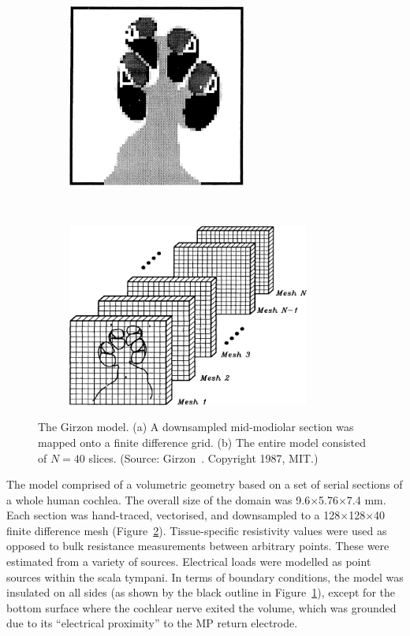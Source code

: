 \begin{figure}
	\centering
    \begin{subfigure}[t]{0.4\textwidth}
        \centering
        \includegraphics[height=6cm]{Background/girzon_section}
        \caption{ }
        \label{fig:girzon_section}
    \end{subfigure}
    ~~~~
    \begin{subfigure}[t]{0.52\textwidth}
        \centering
        \includegraphics[height=6cm]{Background/girzon_slices}
        \caption{ }
        \label{fig:girzon_slices}
    \end{subfigure}
    \caption[The Girzon model]{The Girzon model. (a) A downsampled mid-modiolar
	section was mapped onto a finite difference grid. (b) The entire model
	consisted of $ N=40 $ slices. (Source: Girzon~\cite{girzon1987}. Copyright
	\textcopyright{} 1987, MIT.)}
	\label{fig:model_girzon}
\end{figure}

The model comprised of a volumetric geometry based on a set of serial sections
of a whole human cochlea. The overall size of the domain was 9.6$ \times $5.76$
\times $7.4 mm. Each section was hand-traced, vectorised, and downsampled to a
128$ \times $128$ \times $40 finite difference mesh
(Figure~\ref{fig:girzon_slices}). Tissue-specific resistivity values were used
as opposed to bulk resistance measurements between arbitrary points. These were
estimated from a variety of sources. Electrical loads were modelled as point
sources within the scala tympani. In terms of boundary conditions, the model was
insulated on all sides (as shown by the black outline in
Figure~\ref{fig:girzon_section}), except for the bottom surface where the
cochlear nerve exited the volume, which was grounded due to its ``electrical
proximity'' to the MP return electrode.

